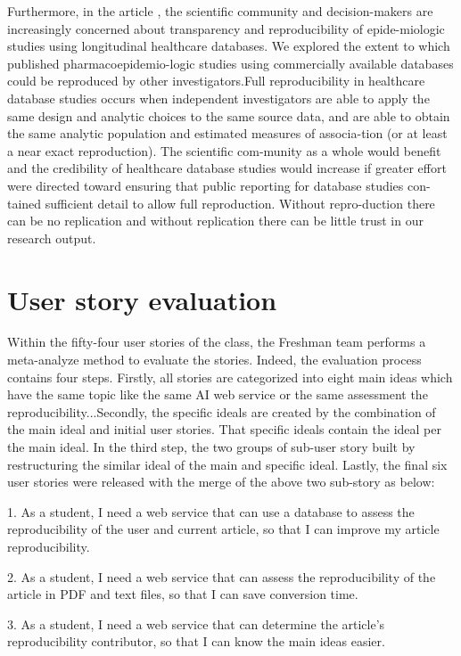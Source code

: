 \documentclass[
10pt, %
a4paper, %
oneside, %
headinclude,footinclude, %
BCOR5mm, %
]{scrartcl}
\begin{document}
Furthermore, in the article \cite{Wang2015}, the scientific community and decision-makers are increasingly concerned about transparency and reproducibility of epide-miologic studies using longitudinal healthcare databases. We explored the extent to which published pharmacoepidemio-logic studies using commercially available databases could be reproduced by other investigators.Full reproducibility in healthcare database studies occurs when independent investigators are able to apply the same design and analytic choices to the same source data, and are able to obtain the same analytic population and estimated measures of associa-tion (or at least a near exact reproduction). The scientific com-munity as a whole would benefit and the credibility of healthcare database studies would increase if greater effort were directed toward ensuring that public reporting for database studies con-tained sufficient detail to allow full reproduction. Without repro-duction there can be no replication and without replication there can be little trust in our research output.

\section{User story evaluation}
Within the fifty-four user stories of the class, the Freshman team performs a meta-analyze method to evaluate the stories. Indeed, the evaluation process contains four steps. Firstly, all stories are categorized into eight main ideas which have the same topic like the same AI web service or the same assessment the reproducibility...Secondly, the specific ideals are created by the combination of the main ideal and initial user stories. That specific ideals contain the ideal per the main ideal. In the third step, the two groups of sub-user story built by restructuring the similar ideal of the main and specific ideal. Lastly, the final six user stories were released with the merge of the above two sub-story as below:

1. As a student, I need a web service that can use a database to assess the reproducibility of the user and current article, so that I can improve my article reproducibility.

2. As a student, I need a web service that can assess the reproducibility of the article in PDF and text files, so that I can save conversion time.

3. As a student, I need a web service that can determine the article's reproducibility contributor, so that I can know the main ideas easier.
\end{document}
